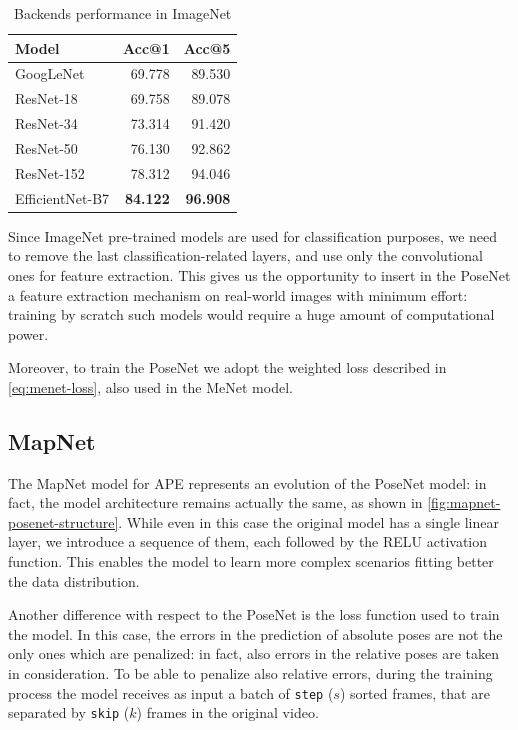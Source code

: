 \begin{table}[htbp]
    \caption{Backends performance in ImageNet}
    \begin{center}
        \begin{tabular}{lrr}
            \toprule
            Model           & Acc@1           & Acc@5           \\
            \midrule
            GoogLeNet       & 69.778          & 89.530          \\
            ResNet-18       & 69.758          & 89.078          \\
            ResNet-34       & 73.314          & 91.420          \\
            ResNet-50       & 76.130          & 92.862          \\
            ResNet-152      & 78.312          & 94.046          \\
            EfficientNet-B7 & \textbf{84.122} & \textbf{96.908} \\
            \bottomrule
        \end{tabular}
        \label{tab:backend-performance-imagenet}
    \end{center}
\end{table}

Since ImageNet pre-trained models are used for classification purposes, we need to remove the last classification-related layers, and use only the convolutional ones for feature extraction. This gives us the opportunity to insert in the PoseNet a feature extraction mechanism on real-world images with minimum effort: training by scratch such models would require a huge amount of computational power.

Moreover, to train the PoseNet we adopt the weighted loss described in \cref{eq:menet-loss}, also used in the MeNet model.

\subsection{MapNet}
The MapNet model for APE represents an evolution of the PoseNet model: in fact, the model architecture remains actually the same, as shown in \cref{fig:mapnet-posenet-structure}. While even in this case the original model has a single linear layer, we introduce a sequence of them, each followed by the RELU activation function. This enables the model to learn more complex scenarios fitting better the data distribution.

Another difference with respect to the PoseNet is the loss function used to train the model. In this case, the errors in the prediction of absolute poses are not the only ones which are penalized: in fact, also errors in the relative poses are taken in consideration. To be able to penalize also relative errors, during the training process the model receives as input a batch of \texttt{step} ($s$) sorted frames, that are separated by \texttt{skip} ($k$) frames in the original video.


